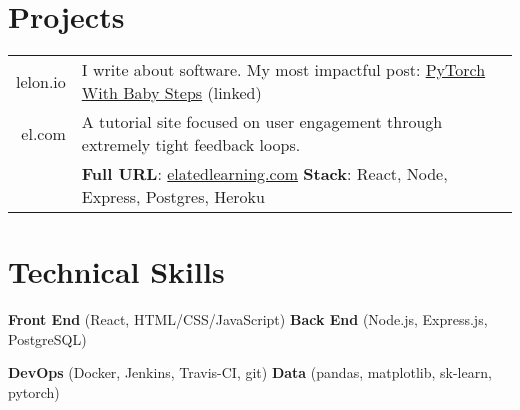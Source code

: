 \documentclass[a4paper,10pt]{article}
\begin{document}
\section{Projects}
\begin{tabular}{rl}	
	
	lelon.io & I write about software. My most impactful post: \href {https://lelon.io/blog/2018/02/08/pytorch-with-baby-steps}{PyTorch With Baby Steps} (linked)  \\
	
	el.com & A tutorial site focused on user engagement through extremely tight feedback loops. \\
	
	 & \textbf{Full URL}: \href {https://www.elatedlearning.com}{elatedlearning.com} \quad \textbf{Stack}: React, Node, Express, Postgres, Heroku\\
\end{tabular}

\section{Technical Skills}

\textbf{Front End} (React, HTML/CSS/JavaScript) \quad\quad\thinspace\thinspace\thinspace\thinspace \textbf{Back End} (Node.js, Express.js, PostgreSQL)

\textbf{DevOps} (Docker, Jenkins, Travis-CI, git) \quad\quad\thinspace\thinspace\thinspace\thinspace\thinspace \textbf{Data} (pandas, matplotlib, sk-learn, pytorch)
\end{document}
